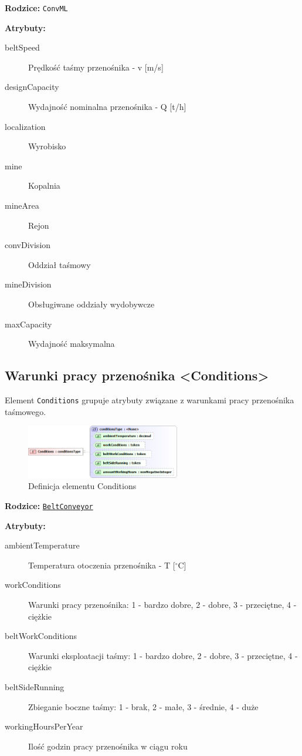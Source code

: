 \documentclass[12pt,a4paper]{article}
\begin{document}
\noindent\textbf{Rodzice:} \texttt{ConvML}

\noindent\textbf{Atrybuty:}
\begin{description}
\item[beltSpeed] Prędkość taśmy przenośnika - v [m/s]
\item[designCapacity] Wydajność nominalna przenośnika - Q [t/h]
\item[localization] Wyrobisko
\item[mine] Kopalnia
\item[mineArea] Rejon
\item[convDivision] Oddział taśmowy
\item[mineDivision] Obsługiwane oddziały wydobywcze
\item[maxCapacity] Wydajność maksymalna
\end{description}


\subsection{Warunki pracy przenośnika <Conditions>}
Element {\tt Conditions} grupuje atrybuty związane z warunkami pracy przenośnika
taśmowego.

\begin{figure}[H]
  \centering
  \includegraphics[width=0.6\textwidth]{png/conditions_xsd2}
  \caption{Definicja elementu Conditions}
  \label{fig:conditions-xsd}
\end{figure}

\noindent\textbf{Rodzice:} \texttt{\hyperref[sec:BeltConveyor]{BeltConveyor}}

\noindent\textbf{Atrybuty:}
\begin{description}
\item[ambientTemperature] Temperatura otoczenia przenośnika - T [$^\circ$C]
\item[workConditions] Warunki pracy przenośnika: 1 - bardzo dobre, 2 - dobre,
  3 - przeciętne, 4 - ciężkie
\item[beltWorkConditions] Warunki eksploatacji taśmy: 1 - bardzo dobre,
  2 - dobre, 3 - przeciętne, 4 - ciężkie
\item[beltSideRunning] Zbieganie boczne taśmy: 1 - brak, 2 - małe, 3 - średnie,
  4 - duże
\item[workingHoursPerYear] Ilość godzin pracy przenośnika w ciągu roku
\end{description}
\end{document}
